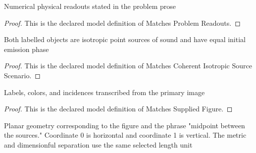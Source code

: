 \begin{definition}
  \label{def:physics:phyx-mini-0312:phyxminiproblems-problemphyxmini0312-matchesproblemreadouts}
  Numerical physical readouts stated in the problem prose
\end{definition}
\begin{proof}
  This is the declared model definition of Matches Problem Readouts.
\end{proof}
\begin{definition}
  \label{def:physics:phyx-mini-0312:phyxminiproblems-problemphyxmini0312-matchescoherentisotropicsourcescenario}
  Both labelled objects are isotropic point sources of sound and have equal initial emission phase
\end{definition}
\begin{proof}
  This is the declared model definition of Matches Coherent Isotropic Source Scenario.
\end{proof}
\begin{definition}
  \label{def:physics:phyx-mini-0312:phyxminiproblems-problemphyxmini0312-matchessuppliedfigure}
  Labels, colors, and incidences transcribed from the primary image
\end{definition}
\begin{proof}
  This is the declared model definition of Matches Supplied Figure.
\end{proof}
\begin{definition}
  \label{def:physics:phyx-mini-0312:phyxminiproblems-problemphyxmini0312-matchessourcegeometry}
  Planar geometry corresponding to the figure and the phrase "midpoint between the sources." Coordinate 0 is horizontal and coordinate 1 is vertical. The metric and dimensionful separation use the same selected length unit
\end{definition}
